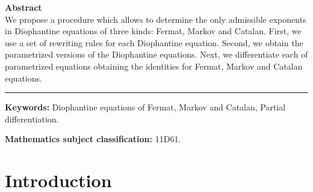 \documentclass[11pt]{article}
\begin{document}
\hfill
\begin{minipage}[t]{0.95\textwidth}

\textbf{Abstract}\\
We propose a procedure which allows to determine the only admissible exponents
in Diophantine equations of three kinds: Fermat, Markov and Catalan.
First, we use a set of rewriting rules for each Diophantine equation.
Second, we obtain the parametrized versions of the Diophantine equations. 
Next, we differentiate each of parametrized equations obtaining the identities
for Fermat, Markov and Catalan equations. 






\vspace{1cm}
\hrule


\end{minipage}

\vspace{1cm}

\textbf{Keywords:} Diophantine equations of Fermat, Markov and Catalan, Partial differentiation.

\textbf{Mathematics subject classification:} 11D61.


\section{Introduction} \label{sec:Intr}
\end{document}
